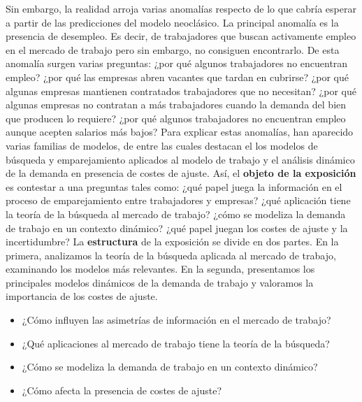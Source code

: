 \documentclass{nuevotema}
\begin{document}
Sin embargo, la realidad arroja varias anomalías respecto de lo que cabría esperar a partir de las predicciones del modelo neoclásico. La principal anomalía es la presencia de desempleo. Es decir, de trabajadores que buscan activamente empleo en el mercado de trabajo pero sin embargo, no consiguen encontrarlo. De esta anomalía surgen varias preguntas: ¿por qué algunos trabajadores no encuentran empleo? ¿por qué las empresas abren vacantes que tardan en cubrirse? ¿por qué algunas empresas mantienen contratados trabajadores que no necesitan? ¿por qué algunas empresas no contratan a más trabajadores cuando la demanda del bien que producen lo requiere? ¿por qué algunos trabajadores no encuentran empleo aunque acepten salarios más bajos? Para explicar estas anomalías, han aparecido varias familias de modelos, de entre las cuales destacan el los modelos de búsqueda y emparejamiento aplicados al modelo de trabajo y el análisis dinámico de la demanda en presencia de costes de ajuste. Así, el \textbf{objeto de la exposición} es contestar a una preguntas tales como: ¿qué papel juega la información en el proceso de emparejamiento entre trabajadores y empresas? ¿qué aplicación tiene la teoría de la búsqueda al mercado de trabajo? ¿cómo se modeliza la demanda de trabajo en un contexto dinámico? ¿qué papel juegan los costes de ajuste y la incertidumbre? La \textbf{estructura} de la exposición se divide en dos partes. En la primera, analizamos la teoría de la búsqueda aplicada al mercado de trabajo, examinando los modelos más relevantes. En la segunda, presentamos los principales modelos dinámicos de la demanda de trabajo y valoramos la importancia de los costes de ajuste. 

\begin{itemize}
	\item ¿Cómo influyen las asimetrías de información en el mercado de trabajo?
	\item ¿Qué aplicaciones al mercado de trabajo tiene la teoría de la búsqueda?
	\item ¿Cómo se modeliza la demanda de trabajo en un contexto dinámico?
	\item ¿Cómo afecta la presencia de costes de ajuste?
\end{itemize}

\esquemacorto
\end{document}
